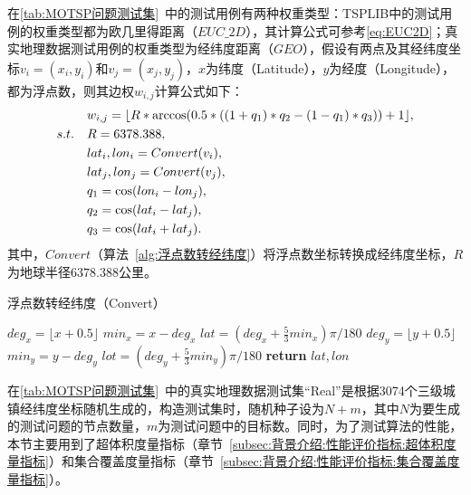 在\autoref{tab:MOTSP问题测试集}~中的测试用例有两种权重类型：TSPLIB中的测试用例的权重类型都为欧几里得距离（$EUC\_2D$），其计算公式可参考\autoref{eq:EUC2D}；真实地理数据测试用例的权重类型为经纬度距离（$GEO$），假设有两点及其经纬度坐标$v_i = (x_i, y_i)$和$v_j = (x_j, y_j)$，$x$为纬度（Latitude），$y$为经度（Longitude），都为浮点数，则其边权$w_{i,j}$计算公式如下：
\vspace{-1em}
\begin{align}
    \label{eq:GEO}
    & w_{i,j} =\lfloor R * \arccos(0.5*((1+q_1)*q_2 - (1-q_1)*q_3)) + 1 \rfloor, \\
    s.t. \quad & R = 6378.388, \notag  \\
    & lat_i, lon_i = Convert(v_i), \notag  \\
    & lat_j, lon_j = Convert(v_j), \notag \\
    & q_1 = \cos(lon_i - lon_j), \notag \\
    & q_2 = \cos(lat_i - lat_j), \notag \\
    & q_3 = \cos(lat_i + lat_j). \notag
\end{align}
其中，$Convert$（算法~\ref{alg:浮点数转经纬度}）将浮点数坐标转换成经纬度坐标，$R$为地球半径$6378.388$公里。
\begin{algorithm}
    \caption{浮点数转经纬度（Convert）}
    \label{alg:浮点数转经纬度}
    \BlankLine
    $deg_x = \lfloor x + 0.5 \rfloor$ \;
    $min_x = x - deg_x$ \;
    $lat = (deg_x + \frac{5}{3}min_x)\pi/180$ \;
    $deg_y = \lfloor y + 0.5 \rfloor$ \;
    $min_y = y - deg_y$ \;
    $lot = (deg_y + \frac{5}{3}min_y)\pi/180$ \;
    \textbf{return } $lat, lon$ \;
\end{algorithm}
\par
在\autoref{tab:MOTSP问题测试集}~中的真实地理数据测试集“Real”是根据3074个三级城镇经纬度坐标随机生成的，构造测试集时，随机种子设为$N+m$，其中$N$为要生成的测试问题的节点数量，$m$为测试问题中的目标数。同时，为了测试算法的性能，本节主要用到了超体积度量指标（章节~\ref{subsec:背景介绍:性能评价指标:超体积度量指标}）和集合覆盖度量指标（章节~\ref{subsec:背景介绍:性能评价指标:集合覆盖度量指标}）。

